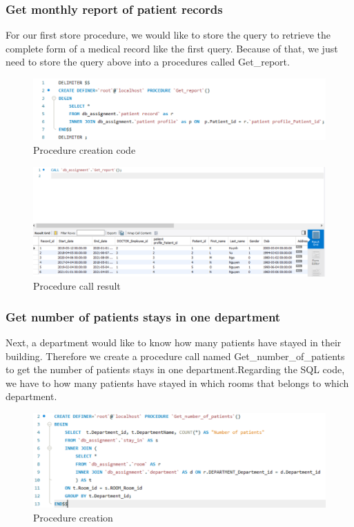 \subsubsection{Get monthly report of patient records}
For our first store procedure, we would like to store the query to retrieve the complete form of a medical record like the first query. Because of that, we just need to store the query above into a procedures called Get\_report.

\begin{figure}[H]
  \centering
  \includegraphics[width = 12cm]{assets/procedure_1a.png}
  \captionsetup{justification=centering,margin=2cm}
  \caption{Procedure creation code}
\end{figure}

\begin{figure}[H]
  \centering
  \includegraphics[width = 12cm]{assets/procedure_1b.png}
  \captionsetup{justification=centering,margin=2cm}
  \caption{Procedure call result}
\end{figure}

\subsubsection{Get number of patients stays in one department}

Next, a department would like to know how many patients have stayed in their building. Therefore we create a procedure call named Get\_number\_of\_patients to get the number of patients stays in one department.Regarding the SQL code, we have to how many patients have stayed in which rooms that belongs to which department.

\begin{figure}[H]
  \centering
  \includegraphics[width = 12cm]{assets/procedure_2a.png}
  \captionsetup{justification=centering,margin=2cm}
  \caption{Procedure creation}
\end{figure}

